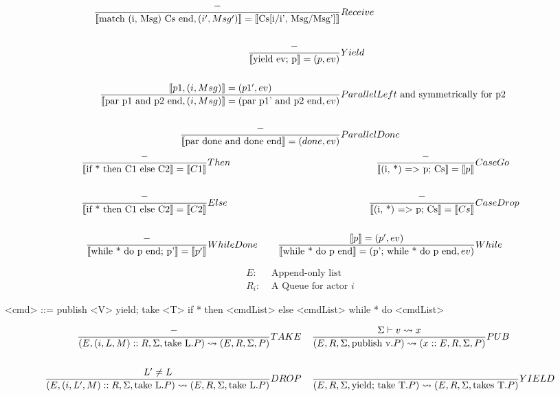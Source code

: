\documentclass[acmsmall,review,anonymous]{acmart}\settopmatter{printfolios=true}
\begin{document}
\begin{align*}
\judge{&Receive}{
	-
}{
	\semfunc[\text{match (i, Msg) Cs end}, (i', Msg')] = \semfunc[\text{Cs[i/i', Msg/Msg']}]  %
}\\
\\
\judge{&Yield}{
	-
}{
	\semfunc[\text{yield ev; p}] = (p, ev)  %
}\\
\\
\judge{&ParallelLeft\text{ and symmetrically for p2}}{  %
	\semfunc[p1, (i, Msg)] = (p1', ev)
}{
	\semfunc[\text{par p1 and p2 end}, (i, Msg)] = (\text{par p1' and p2 end}, ev)
}\\
\\
\judge{&ParallelDone}{
    -
}{
	\semfunc[\text{par done and done end}] = (done, ev)
}
\end{align*}
\begin{align*}
\judge{&Then}{
	-
}{
	\semfunc[\text{if * then C1 else C2}] = \semfunc[C1]
}& \;\;\;\;
\judge{&CaseGo}{
	- %
}{
	\semfunc[\text{(i, *) => p; Cs}] = \semfunc[p]
}\\
\\
\judge{&Else}{
	-
}{
	\semfunc[\text{if * then C1 else C2}] = \semfunc[C2]
}& \;\;\;\;
\judge{&CaseDrop}{
	-
}{
	\semfunc[\text{(i, *) => p; Cs}] = \semfunc[Cs]
}\\
\\
\judge{&WhileDone}{
	-
}{
	\semfunc[\text{while * do p end; p'}] = \semfunc[p']
}& \;\;\;\;
\judge{&While}{
	\semfunc[p] = (p', ev)
}{
	\semfunc[\text{while * do p end}] = (\text{p'; while * do p end}, ev)
}
\end{align*}

\vfill
\pagebreak




\begin{align*}
	E :& \text{ Append-only list} \\
    R_i :& \text{ A Queue for actor } i
\end{align*}

\begin{grammar}
	<cmd> ::= publish <V>
         \alt yield; take <T>
         \alt if * then <cmdList> else <cmdList>
         \alt while * do <cmdList>
\end{grammar}


\begin{align*}
\judge{TAKE}{
	-
}{
	(E, (i, L, M)::R, \Sigma, \text{take L}.P) \reduce (E, R, \Sigma, P)
}& \;\;\;\;
\judge{PUB}{
	\Sigma \vdash v \reduce x
}{
	(E, R, \Sigma, \text{publish v}.P)\reduce (x::E, R, \Sigma, P)
}\\
\\
\judge{DROP}{
	L' \neq L
}{
	(E, (i, L', M)::R, \Sigma, \text{take L}.P) \reduce (E, R, \Sigma, \text{take L}.P)
} & \;\;\;\;
\judge{YIELD}{
	 \;
}{
	(E, R, \Sigma, \text{yield; take T}.P) \reduce (E, R, \Sigma, \text{takes T}.P)
}
\end{align*}
\end{document}
